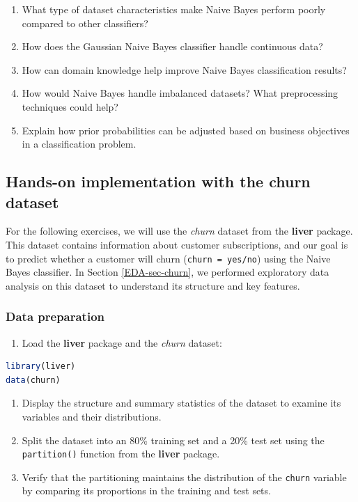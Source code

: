 \documentclass[
  11pt,
]{book}
\newcommand{\passthrough}[1]{#1}
\providecommand{\tightlist}{%
  \setlength{\itemsep}{0pt}\setlength{\parskip}{0pt}}
\theoremstyle{definition}
\theoremstyle{definition}
\theoremstyle{definition}
\theoremstyle{definition}
\theoremstyle{remark}
\begin{document}
\begin{enumerate}
\item
  What type of dataset characteristics make Naive Bayes perform poorly compared to other classifiers?\\
\item
  How does the Gaussian Naive Bayes classifier handle continuous data?\\
\item
  How can domain knowledge help improve Naive Bayes classification results?\\
\item
  How would Naive Bayes handle imbalanced datasets? What preprocessing techniques could help?\\
\item
  Explain how prior probabilities can be adjusted based on business objectives in a classification problem.
\end{enumerate}

\subsection*{Hands-on implementation with the churn dataset}\label{hands-on-implementation-with-the-churn-dataset}


For the following exercises, we will use the \emph{churn} dataset from the \textbf{liver} package. This dataset contains information about customer subscriptions, and our goal is to predict whether a customer will churn (\passthrough{\lstinline!churn = yes/no!}) using the Naive Bayes classifier. In Section \ref{EDA-sec-churn}, we performed exploratory data analysis on this dataset to understand its structure and key features.

\subsubsection*{Data preparation}\label{data-preparation-2}


\begin{enumerate}
\def\labelenumi{\arabic{enumi}.}
\setcounter{enumi}{16}
\tightlist
\item
  Load the \textbf{liver} package and the \emph{churn} dataset:
\end{enumerate}

\begin{lstlisting}[language=R]
library(liver)
data(churn)
\end{lstlisting}

\begin{enumerate}
\def\labelenumi{\arabic{enumi}.}
\setcounter{enumi}{17}
\item
  Display the structure and summary statistics of the dataset to examine its variables and their distributions.
\item
  Split the dataset into an 80\% training set and a 20\% test set using the \passthrough{\lstinline!partition()!} function from the \textbf{liver} package.
\item
  Verify that the partitioning maintains the distribution of the \passthrough{\lstinline!churn!} variable by comparing its proportions in the training and test sets.
\end{enumerate}
\end{document}
